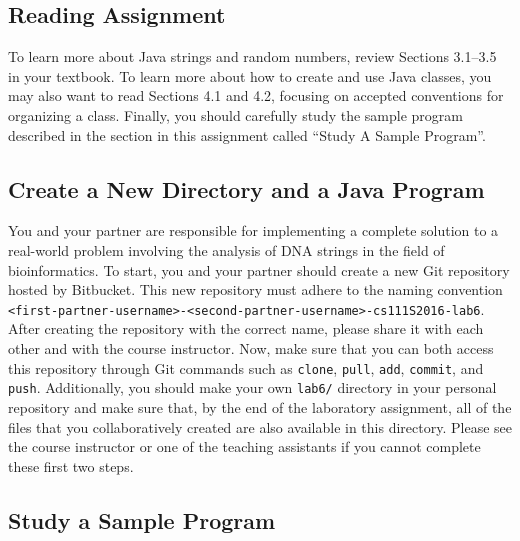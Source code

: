 \vspace{-0.2in}
\subsection*{Reading Assignment}
\vspace{-0.05in}

To learn more about Java strings and random numbers, review Sections 3.1--3.5 in your textbook. To learn more about how
to create and use Java classes, you may also want to read Sections 4.1 and 4.2, focusing on accepted conventions for
organizing a class. Finally, you should carefully study the sample program described in the section in this assignment
called ``{Study A Sample Program}''.

\vspace{-0.05in}
\subsection*{Create a New Directory and a Java Program}
\vspace{-0.05in}

You and your partner are responsible for implementing a complete solution to a real-world problem involving the analysis
of DNA strings in the field of bioinformatics. To start, you and your partner should create a new Git repository hosted
by Bitbucket. This new repository must adhere to the naming convention {\tt
<first-partner-username>-<second-partner-username>-cs111S2016-lab6}. After creating the repository with the correct
name, please share it with each other and with the course instructor. Now, make sure that you can both access this
repository through Git commands such as {\tt clone}, {\tt pull}, {\tt add}, {\tt commit}, and {\tt push}. Additionally,
you should make your own {\tt lab6/} directory in your personal repository and make sure that, by the end of the
laboratory assignment, all of the files that you collaboratively created are also available in this directory. Please
see the course instructor or one of the teaching assistants if you cannot complete these first two steps.


\vspace{-0.05in}
\subsection*{Study a Sample Program}
\vspace{-0.05in}

